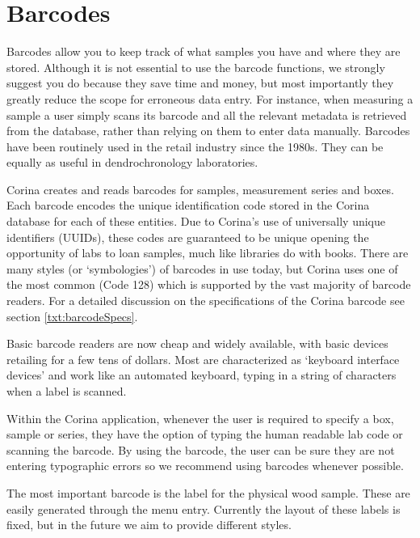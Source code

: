 \section{Barcodes}
\label{txt:barcodes}

Barcodes allow you to keep track of what samples you have and where they are stored.  Although it is not essential to use the barcode functions, we strongly suggest you do because they save time and money, but most importantly they greatly reduce the scope for erroneous data entry.  For instance, when measuring a sample a user simply scans its barcode and all the relevant metadata is retrieved from the database, rather than relying on them to enter data manually.  Barcodes have been routinely used in the retail industry since the 1980s.  They can be equally as useful in dendrochronology laboratories.

Corina creates and reads barcodes for samples, measurement series and boxes.  Each barcode encodes the unique identification code stored in the Corina database for each of these entities.  Due to Corina's use of universally unique identifiers (UUIDs), these codes are guaranteed to be unique opening the opportunity of labs to loan samples, much like libraries do with books.  There are many styles (or `symbologies') of barcodes in use today, but Corina uses one of the most common (Code 128) which is supported by the vast majority of barcode readers.  For a detailed discussion on the specifications of the Corina barcode see section \ref{txt:barcodeSpecs}.

Basic barcode readers are now cheap and widely available, with basic devices retailing for a few tens of dollars.  Most are characterized as `keyboard interface devices' and work like an automated keyboard, typing in a string of characters when a label is scanned.  

Within the Corina application, whenever the user is required to specify a box, sample or series, they have the option of typing the human readable lab code or scanning the barcode. By using the barcode, the user can be sure they are not entering typographic errors so we recommend using barcodes whenever possible. 

The most important barcode is the label for the physical wood sample.  These are easily generated through the  menu entry.  Currently the layout of these labels is fixed, but in the future we aim to provide different styles.  

